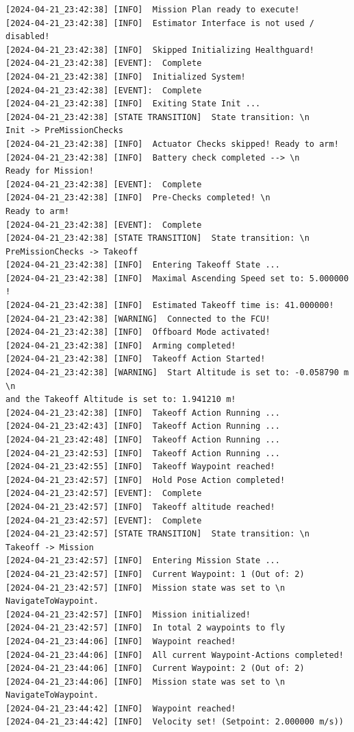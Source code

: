 \begin{lstlisting}
[2024-04-21_23:42:38] [INFO]  Mission Plan ready to execute!
[2024-04-21_23:42:38] [INFO]  Estimator Interface is not used / disabled!
[2024-04-21_23:42:38] [INFO]  Skipped Initializing Healthguard!
[2024-04-21_23:42:38] [EVENT]:  Complete
[2024-04-21_23:42:38] [INFO]  Initialized System!
[2024-04-21_23:42:38] [EVENT]:  Complete
[2024-04-21_23:42:38] [INFO]  Exiting State Init ...
[2024-04-21_23:42:38] [STATE TRANSITION]  State transition: \n 
Init -> PreMissionChecks
[2024-04-21_23:42:38] [INFO]  Actuator Checks skipped! Ready to arm!
[2024-04-21_23:42:38] [INFO]  Battery check completed --> \n 
Ready for Mission!
[2024-04-21_23:42:38] [EVENT]:  Complete
[2024-04-21_23:42:38] [INFO]  Pre-Checks completed! \n 
Ready to arm!
[2024-04-21_23:42:38] [EVENT]:  Complete
[2024-04-21_23:42:38] [STATE TRANSITION]  State transition: \n 
PreMissionChecks -> Takeoff
[2024-04-21_23:42:38] [INFO]  Entering Takeoff State ...
[2024-04-21_23:42:38] [INFO]  Maximal Ascending Speed set to: 5.000000 !
[2024-04-21_23:42:38] [INFO]  Estimated Takeoff time is: 41.000000!
[2024-04-21_23:42:38] [WARNING]  Connected to the FCU!
[2024-04-21_23:42:38] [INFO]  Offboard Mode activated!
[2024-04-21_23:42:38] [INFO]  Arming completed!
[2024-04-21_23:42:38] [INFO]  Takeoff Action Started!
[2024-04-21_23:42:38] [WARNING]  Start Altitude is set to: -0.058790 m \n 
and the Takeoff Altitude is set to: 1.941210 m!
[2024-04-21_23:42:38] [INFO]  Takeoff Action Running ...
[2024-04-21_23:42:43] [INFO]  Takeoff Action Running ...
[2024-04-21_23:42:48] [INFO]  Takeoff Action Running ...
[2024-04-21_23:42:53] [INFO]  Takeoff Action Running ...
[2024-04-21_23:42:55] [INFO]  Takeoff Waypoint reached!
[2024-04-21_23:42:57] [INFO]  Hold Pose Action completed!
[2024-04-21_23:42:57] [EVENT]:  Complete
[2024-04-21_23:42:57] [INFO]  Takeoff altitude reached!
[2024-04-21_23:42:57] [EVENT]:  Complete
[2024-04-21_23:42:57] [STATE TRANSITION]  State transition: \n 
Takeoff -> Mission
[2024-04-21_23:42:57] [INFO]  Entering Mission State ...
[2024-04-21_23:42:57] [INFO]  Current Waypoint: 1 (Out of: 2)
[2024-04-21_23:42:57] [INFO]  Mission state was set to \n 
NavigateToWaypoint.
[2024-04-21_23:42:57] [INFO]  Mission initialized!
[2024-04-21_23:42:57] [INFO]  In total 2 waypoints to fly
[2024-04-21_23:44:06] [INFO]  Waypoint reached!
[2024-04-21_23:44:06] [INFO]  All current Waypoint-Actions completed!
[2024-04-21_23:44:06] [INFO]  Current Waypoint: 2 (Out of: 2)
[2024-04-21_23:44:06] [INFO]  Mission state was set to \n 
NavigateToWaypoint.
[2024-04-21_23:44:42] [INFO]  Waypoint reached!
[2024-04-21_23:44:42] [INFO]  Velocity set! (Setpoint: 2.000000 m/s))

\end{lstlisting}
